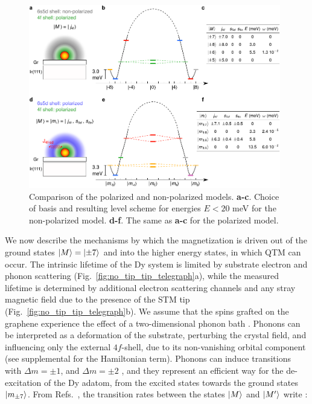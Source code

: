 \documentclass[
reprint,amsmath,amssymb,aps]{revtex4-2}
\begin{document}
\begin{figure}[ht!]
\includegraphics[width=0.98\textwidth]{Fig1_new.pdf}
\caption{Comparison of the polarized and non-polarized models. \textbf{a-c}. Choice of basis and resulting level scheme for energies $E<20$ meV for the non-polarized model. \textbf{d-f}. The same as \textbf{a-c} for the polarized model. 
\label{fig:intra} }
\end{figure}

We now describe the mechanisms by which the magnetization is driven out of the ground states $\ket{M}=\ket{\pm7}$ and into the higher energy states, in which QTM can occur. The intrinsic lifetime of the Dy system is limited by substrate electron and phonon scattering (Fig.~\ref{fig:no_tip_tip_telegraph}a), while the measured lifetime is determined by additional electron scattering channels and any stray magnetic field due to the presence of the STM tip (Fig.~\ref{fig:no_tip_tip_telegraph}b).  We assume that the spins grafted on the graphene experience the effect of a two-dimensional phonon bath \cite{cervetti2016}. Phonons can be interpreted as a deformation of the substrate, perturbing the crystal field, and influencing only the external $4f$-shell, due to its non-vanishing orbital component (see supplemental for the Hamiltonian term). Phonons can induce transitions with $\Delta m = \pm 1$, and $\Delta m = \pm 2$ \citep{cervetti2016}, and they represent an efficient way for the de-excitation of the Dy adatom, from the excited states towards the ground states $\ket{m_{\pm 7}}$. From Refs.~\cite{politi_tunneling_1995, cervetti2016}, the transition rates between the states $\ket{M}$ and $\ket{M^{\prime}}$ write :
\end{document}
